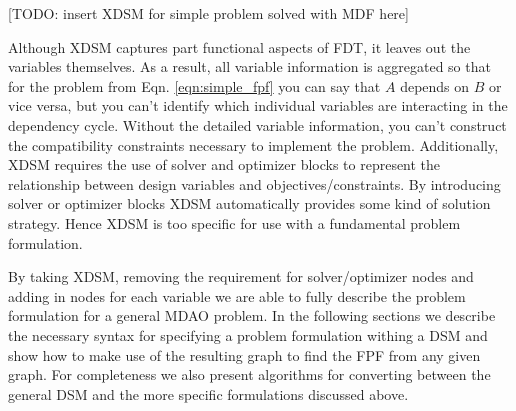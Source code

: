     [TODO: insert XDSM for simple problem solved with MDF here]

    Although XDSM captures part functional aspects of FDT, it  leaves out the variables themselves. As a result, all variable information is aggregated 
    so that for the problem from Eqn. \ref{eqn:simple_fpf} you can say that $A$ depends on $B$ or vice versa, but you can't identify which 
    individual variables are interacting in the dependency cycle. Without the detailed variable information, you can't construct the compatibility 
    constraints necessary to implement the problem. Additionally, XDSM requires the use of solver and optimizer blocks to represent 
    the relationship between design variables and objectives/constraints. By introducing solver or optimizer blocks XDSM automatically provides
    some kind of solution strategy. Hence XDSM is too specific for use with a fundamental problem formulation. 

    By taking XDSM, removing the requirement for solver/optimizer nodes and adding in nodes for each variable we are able to fully describe 
    the problem formulation for a general MDAO problem. In the following sections we describe the necessary syntax for specifying a 
    problem formulation withing a DSM and show how to make use of the resulting graph to find the FPF from any given graph. For completeness we 
    also present algorithms for converting between the general DSM and the more specific formulations discussed above. 


